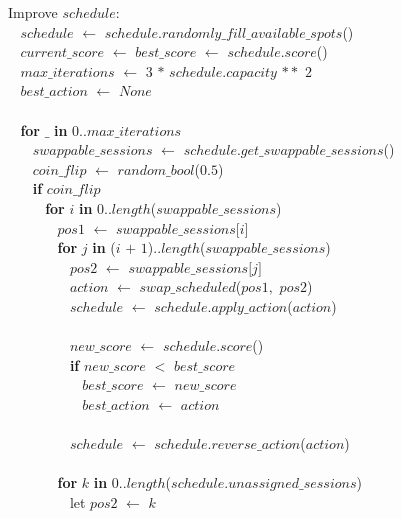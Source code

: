 \begin{tabbing}Improve $schedule$$:$\\
$~~~~$$schedule$ $\leftarrow$ $schedule$$.$$randomly\_fill\_available\_spots$()\\
$~~~~$$current\_score$ $\leftarrow$ $best\_score$ $\leftarrow$ $schedule$$.$$score$()\\
$~~~~$$max\_iterations$ $\leftarrow$ $3$ $*$ $schedule$$.$$capacity$ $**$ $2$\\
$~~~~$$best\_action$ $\leftarrow$ $None$\\
\\
$~~~~${\bf for} $\_$ {\bf in} $0..$$max\_iterations$\\
$~~~~~~~~$$swappable\_sessions$ $\leftarrow$ $schedule$$.$$get\_swappable\_sessions$()\\
$~~~~~~~~$$coin\_flip$ $\leftarrow$ $random\_bool$($0.5$)\\
$~~~~~~~~${\bf if} $coin\_flip$\\
$~~~~~~~~~~~~${\bf for} $i$ {\bf in} $0..$$length$($swappable\_sessions$)\\
$~~~~~~~~~~~~~~~~$$pos1$ $\leftarrow$ $swappable\_sessions$$[$$i$$]$\\
$~~~~~~~~~~~~~~~~${\bf for} $j$ {\bf in} ($i$ $+$ $1$)$..$$length$($swappable\_sessions$)\\
$~~~~~~~~~~~~~~~~~~~~$$pos2$ $\leftarrow$ $swappable\_sessions$$[$$j$$]$\\
$~~~~~~~~~~~~~~~~~~~~$$action$ $\leftarrow$ $swap\_scheduled$($pos1$$,$ $pos2$)\\
$~~~~~~~~~~~~~~~~~~~~$$schedule$ $\leftarrow$ $schedule$$.$$apply\_action$($action$)\\
$~~~~~~~~~~~~~~~~~~~~$\\
$~~~~~~~~~~~~~~~~~~~~$$new\_score$ $\leftarrow$ $schedule$$.$$score$()\\
$~~~~~~~~~~~~~~~~~~~~${\bf if} $new\_score$ $<$ $best\_score$\\
$~~~~~~~~~~~~~~~~~~~~~~~~$$best\_score$ $\leftarrow$ $new\_score$\\
$~~~~~~~~~~~~~~~~~~~~~~~~$$best\_action$ $\leftarrow$ $action$\\
\\
$~~~~~~~~~~~~~~~~~~~~$$schedule$ $\leftarrow$ $schedule$$.$$reverse\_action$($action$)\\
\\
$~~~~~~~~~~~~~~~~${\bf for} $k$ {\bf in} $0..$$length$($schedule$$.$$unassigned\_sessions$)\\
$~~~~~~~~~~~~~~~~~~~~$let $pos2$ $\leftarrow$ $k$\\

\end{tabbing}
